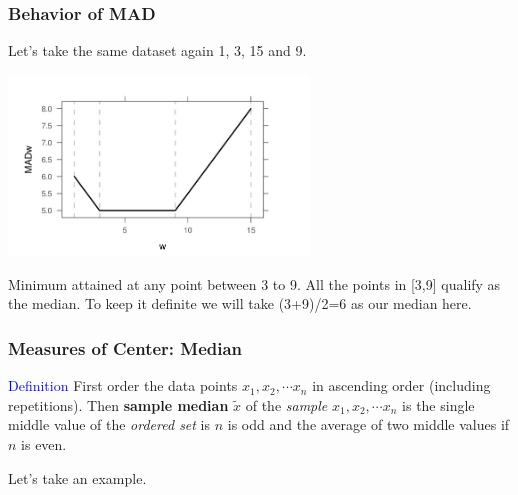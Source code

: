\documentclass{beamer}\usepackage[]{graphicx}\usepackage[]{color}
\begin{document}
\begin{frame}

\frametitle{Behavior of MAD}
Let's take the same dataset again 1, 3, 15 and 9.
\begin{center}
\includegraphics[width = 0.6\textwidth, keepaspectratio]{madw.jpeg} 
\end{center}

\pause
\begin{center}
Minimum attained at any point between 3 to 9. \pause All the points in [3,9] qualify as the median. \pause To keep it definite we will take (3+9)/2=6 as our median here.
\end{center}
\end{frame}

\begin{frame}

\frametitle{Measures of Center: Median}
\textcolor{blue}{Definition} First order the data points $x_1, x_2, \cdots x_n$ in ascending order (including repetitions). Then \textbf{sample median} $\tilde{x}$ of the \emph{sample} $x_1, x_2, \cdots x_n$ is the single middle value of the \emph{ordered set} is $n$ is odd and the average of two middle values if $n$ is even.
\vspace{0.2in}
\begin{center}
Let's take an example.
\end{center}

\end{frame}
\end{document}
